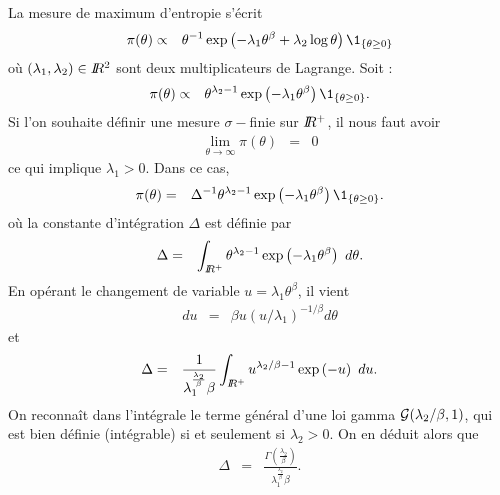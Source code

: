 \begin{rep}
 La mesure de maximum d'entropie s'écrit 
\begin{eqnarray*}
\pi(\theta) & \propto & \theta^{-1} \exp\left(- \lambda_1 \theta^{\beta} + \lambda_2\log \theta\right) \1_{\{ \theta\geq 0\}}
\end{eqnarray*} 
où $(\lambda_1,\lambda_2)\in I\!\!R^2$ sont deux multiplicateurs de Lagrange. Soit :
\begin{eqnarray*}
\pi(\theta) & \propto & \theta^{\lambda_2-1} \exp\left(- \lambda_1 \theta^{\beta}\right)\1_{\{ \theta\geq 0\}}.
\end{eqnarray*} 
Si l'on souhaite définir une mesure $\sigma-$finie sur $I\!\!R^+$, il nous faut avoir
\begin{eqnarray*}
\lim\limits_{\theta\to\infty} \pi(\theta) & = & 0
\end{eqnarray*}
ce qui implique $\lambda_1>0$. Dans ce cas, 
\begin{eqnarray*}
\pi(\theta) & = & \Delta^{-1} \theta^{\lambda_2-1} \exp\left(- \lambda_1 \theta^{\beta}\right)\1_{\{ \theta\geq 0\}}.
\end{eqnarray*} 
où la constante d'intégration $\Delta$ est définie par
\begin{eqnarray*}
\Delta & = & \int_{I\!\!R^+} \theta^{\lambda_2-1} \exp\left(- \lambda_1 \theta^{\beta}\right) \ d\theta.
\end{eqnarray*} 
En opérant le changement de variable $u=\lambda_1\theta^{\beta}$, il vient
\begin{eqnarray*}
d u & = & \beta u (u/\lambda_1)^{-1/\beta} d \theta
\end{eqnarray*} 
et
\begin{eqnarray*}
\Delta & = & \frac{1}{\lambda^{\frac{\lambda_2}{\beta}}_1 \beta} \int_{I\!\!R^+} u^{\lambda_2/\beta-1} \exp\left(- u\right) \ du.
\end{eqnarray*} 
On reconnaît dans l'intégrale le terme général d'une loi gamma ${\cal{G}}(\lambda_2/\beta,1)$, qui est bien définie (intégrable) si et seulement si $\lambda_2>0$. On en déduit alors que 
\begin{eqnarray*}
\Delta & = & \frac{\Gamma\left(\frac{\lambda_2}{\beta}\right)}{\lambda^{\frac{\lambda_2}{\beta}}_1 \beta}.
\end{eqnarray*} 
\end{rep}

